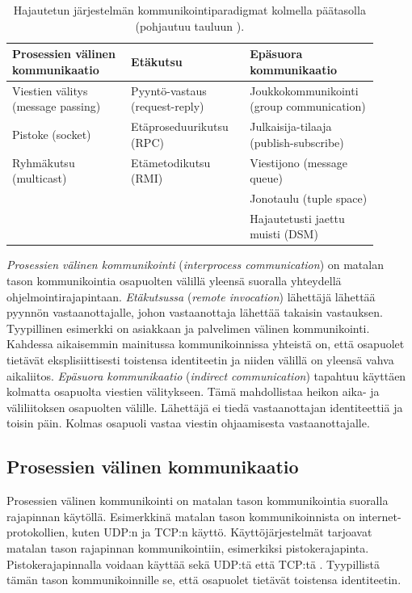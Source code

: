 \begin{table}[ht!]
	\caption{Hajautetun järjestelmän kommunikointiparadigmat kolmella päätasolla (pohjautuu tauluun \mbox{\cite[s.~46]{distributed-systems-concepts-and-design}}).}
	\label{tab:communication-paradigms}
	\begin{tabular}{p{0.3\linewidth} | p{0.3\linewidth} | p{0.3\linewidth}}
		\hline
		\textbf{Prosessien välinen kommunikaatio} & \textbf{Etäkutsu} & \textbf{Epäsuora kommunikaatio} \\
		\hline \hline
		Viestien välitys (message passing) & Pyyntö-vastaus (request-reply) & Joukkokommunikointi (group communication) \\
		\hline
		Pistoke (socket) & Etäproseduurikutsu (RPC) & Julkaisija-tilaaja (publish-subscribe) \\
		\hline
		Ryhmäkutsu (multicast) & Etämetodikutsu (RMI) & Viestijono (message queue) \\
		\hline
		& & Jonotaulu (tuple space) \\
		\hline
		& & Hajautetusti jaettu muisti (DSM) \\
		\hline
	\end{tabular}
\end{table}

\emph{Prosessien välinen kommunikointi} (\emph{interprocess communication}) on matalan tason kommunikointia osapuolten välillä yleensä suoralla yhteydellä ohjelmointirajapintaan. \emph{Etäkutsussa} (\emph{remote invocation}) lähettäjä lähettää pyynnön vastaanottajalle, johon vastaanottaja lähettää takaisin vastauksen. Tyypillinen esimerkki on asiakkaan ja palvelimen välinen kommunikointi. Kahdessa aikaisemmin mainitussa kommunikoinnissa yhteistä on, että osapuolet tietävät eksplisiittisesti toistensa identiteetin ja niiden välillä on yleensä vahva aikaliitos. \emph{Epäsuora kommunikaatio} (\emph{indirect communication}) tapahtuu käyttäen kolmatta osapuolta viestien välitykseen. Tämä mahdollistaa heikon aika- ja väliliitoksen osapuolten välille. Lähettäjä ei tiedä vastaanottajan identiteettiä ja toisin päin. Kolmas osapuoli vastaa viestin ohjaamisesta vastaanottajalle. \mbox{\cite[s.~43--45]{distributed-systems-concepts-and-design}}


\subsection{Prosessien välinen kommunikaatio}
\label{ch:interprocess-communication}
Prosessien välinen kommunikointi on matalan tason kommunikointia suoralla rajapinnan käytöllä. Esimerkkinä matalan tason kommunikoinnista on internet-protokollien, kuten UDP:n ja TCP:n käyttö. Käyttöjärjestelmät tarjoavat matalan tason rajapinnan kommunikointiin, esimerkiksi pistokerajapinta. Pistokerajapinnalla voidaan käyttää sekä UDP:tä että TCP:tä \cite[s.~1152]{linux-programming-interface}. Tyypillistä tämän tason kommunikoinnille se, että osapuolet tietävät toistensa identiteetin.

